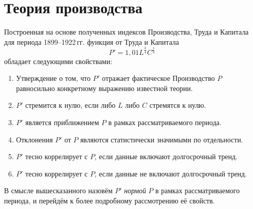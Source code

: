 \documentclass[leqno]{article}  %
\begin{document}
\section{Теория производства}
Построенная на основе полученных индексов Производства, Труда и Капитала для периода 1899--1922\,гг. функция от Труда и Капитала
\[P'=1,01L^{\frac34}C^{\frac14}\]
обладает следующими свойствами:
\begin{enumerate}[{1)}]
\item Утверждение о том, что \(P'\) отражает фактическое Производство \(P\) равносильно конкретному выражению известной теории.
\item \(P'\) стремится к нулю, если либо \(L\) либо \(C\) стремятся к нулю.
\item \(P'\) является приближением \(P\) в рамках рассматриваемого периода.
\item Отклонения \(P'\) от \(P\) являются статистически значимыми по отдельности.
\item \(P'\) тесно коррелирует с \(P\), если данные включают долгосрочный тренд.
\item \(P'\) тесно коррелирует с \(P\), если данные не включают долгосрочный тренд.
\end{enumerate}
В смысле вышесказанного назовём \(P'\) \emph{нормой} \(P\) в рамках рассматриваемого периода, и перейдём к более подробному рассмотрению её свойств.
\end{document}
